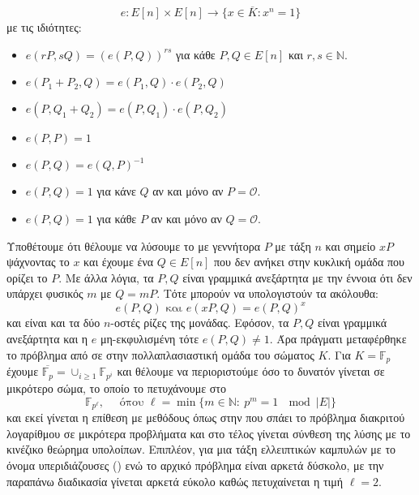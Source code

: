 \documentclass[oneside,a4paper]{article}
\begin{document}
$$e: E[n]\times E[n] \longrightarrow \{x\in \overline{K}: x^n = 1\}$$ με τις ιδιότητες:

\begin{itemize}
	\item $e(rP,sQ) = \left(e(P,Q)\right)^{rs}$ για κάθε $P,Q \in E[n]$ και $r,s\in \mathbb{N}$.
	\item $e(P_1 + P_2, Q) = e(P_1,Q)\cdot e(P_2,Q)$
	\item $e(P, Q_1 + Q_2) = e(P,Q_1)\cdot e(P,Q_2)$
	\item $e(P,P) = 1$
	\item $e(P,Q) = e(Q,P)^{-1}$
	\item $e(P,Q) = 1$ για κάνε $Q$ αν και μόνο αν $P=\mathcal{O}$.
	\item $e(P,Q) = 1$ για κάθε $P$ αν και μόνο αν $Q = \mathcal{O}$.
\end{itemize}

Υποθέτουμε ότι θέλουμε να λύσουμε το  με γεννήτορα $P$ με τάξη $n$ και σημείο $xP$ ψάχνοντας το $x$ και έχουμε ένα $Q \in E[n]$ που δεν ανήκει στην κυκλική ομάδα που ορίζει το $P$. Με άλλα λόγια, τα $P,Q$ είναι γραμμικά ανεξάρτητα με την έννοια ότι δεν υπάρχει φυσικός $m$ με $Q=mP$. Τότε μπορούν να υπολογιστούν τα ακόλουθα:
$$e(P,Q) \text{ και } e(xP,Q) = e(P,Q)^x $$ και είναι και τα δύο $n$-οστές ρίζες της μονάδας. Εφόσον, τα $P,Q$ είναι γραμμικά ανεξάρτητα και η $e$ μη-εκφυλισμένη τότε $e(P,Q) \neq 1$. Άρα πράγματι μεταφέρθηκε το πρόβλημα από  σε  στην πολλαπλασιαστική ομάδα του σώματος $K$. Για $K=\mathbb{F}_p$ έχουμε $\overline{\mathbb{F}_p} = \cup_{i\geq 1}\mathbb{F}_{p^i}$ και θέλουμε να περιοριστούμε όσο το δυνατόν γίνεται σε μικρότερο σώμα, το οποίο το πετυχάνουμε στο
$$\mathbb{F}_{p^{\ell}}, \quad \text{ όπου } \ell = \min\{ m \in \mathbb{N}: \ p^m = 1  \ \mod |E|\}$$ και εκεί γίνεται η επίθεση με μεθόδους όπως στην  που σπάει το πρόβλημα διακριτού λογαρίθμου σε μικρότερα προβλήματα και στο τέλος γίνεται σύνθεση της λύσης με το κινέζικο θεώρημα υπολοίπων. Επιπλέον, για μια τάξη ελλειπτικών καμπυλών με το όνομα υπεριδιάζουσες () ενώ το αρχικό πρόβλημα  είναι αρκετά δύσκολο, με την παραπάνω διαδικασία γίνεται αρκετά εύκολο καθώς πετυχαίνεται η τιμή $\ell = 2$.




\subsection{}
\end{document}
